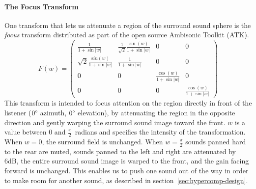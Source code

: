 \paragraph{The Focus Transform} One transform that lets us attenuate a
region of the surround sound sphere is the \textit{focus} transform
distributed as part of the open source Ambisonic Toolkit
(ATK).\cite{Anderson2009}
\begin{equation}
F(w)=\left( \begin{array}{cccc}
\frac{1}{1 + \sin|w|} & 
\frac{1}{\sqrt{2}} \frac{\sin(w)}{1 + \sin|w|}  & 
0 &
0 \\
\sqrt{2}\frac{sin(w)}{1 + \sin|w|} & %
\frac{1}{1 + \sin|w|} &                    %
0 & 
0 \\
0 & 
0 &
\frac{\cos(w)}{1 + \sin|w|} &
0 \\
0 &
0 &
0 &
\frac{\cos(w)}{1 + \sin|w|} 
\end{array} \right)
\label{eq:focus}
\end{equation}
This transform is intended to focus attention on the region directly
in front of the listener ($0\degree$ azimuth, $0\degree$ elevation),
by attenuating the region in the opposite direction and gently warping
the surround sound image toward the front. $w$ is a value between $0$
and $\frac{\pi}{2}$~radians and specifies the intensity of the
transformation. When $w=0$, the surround field is unchanged. When
$w=\frac{\pi}{2}$ sounds panned hard to the rear are muted, sounds
panned to the left and right are attenuated by 6dB, the entire
surround sound image is warped to the front, and the gain facing
forward is unchanged. This enables us to push one sound out of the way
in order to make room for another sound, as described in
section~\ref{sec:hypercomp-design}.


